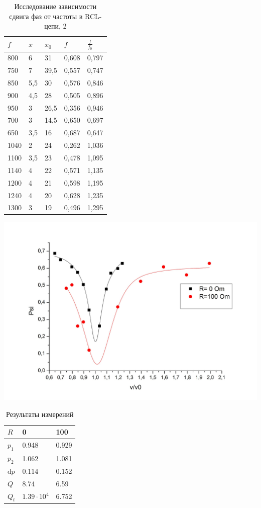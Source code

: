 \documentclass[a4paper,12pt]{article}
\newcommand{\dif}{\mathrm{d}}
\begin{document}
	\begin{table}[h]
		\centering
		\caption{Исследование зависимости сдвига фаз от частоты в RCL-цепи, 2}
		\label{my-label}
		\begin{tabular}{|l|l|l|l|l|}
			\hline
			$f$    & $x$   & $x_0$ & $f$     & $\frac{f}{f_0}$ \\ \hline
			800  & 6   & 31   & 0,608 & 0,797  \\ \hline
			750  & 7   & 39,5 & 0,557 & 0,747  \\ \hline
			850  & 5,5 & 30   & 0,576 & 0,846  \\ \hline
			900  & 4,5 & 28   & 0,505 & 0,896  \\ \hline
			950  & 3   & 26,5 & 0,356 & 0,946  \\ \hline
			700  & 3   & 14,5 & 0,650 & 0,697  \\ \hline
			650  & 3,5 & 16   & 0,687 & 0,647  \\ \hline
			1040 & 2   & 24   & 0,262 & 1,036  \\ \hline
			1100 & 3,5 & 23   & 0,478 & 1,095  \\ \hline
			1140 & 4   & 22   & 0,571 & 1,135  \\ \hline
			1200 & 4   & 21   & 0,598 & 1,195  \\ \hline
			1240 & 4   & 20   & 0,628 & 1,235  \\ \hline
			1300 & 3   & 19   & 0,496 & 1,295  \\ \hline
		\end{tabular}
	\end{table}
	
	\includegraphics[width = 0.7\linewidth]{graph5}

	\begin{table}[h]
		\centering
		\caption{Результаты измерений}
		\label{my-label}
		\begin{tabular}{|l|l|l|}
			\hline
			$R$      & 0                & 100   \\ \hline
			$p_1$    & 0.948            & 0.929 \\ \hline
			$p_2$    & 1.062            & 1.081 \\ \hline
			$\dif p$ & 0.114            & 0.152 \\ \hline
			$Q$      & 8.74             & 6.59  \\ \hline
			$Q_t$    & $1.39\cdot 10^4$ & 6.752 \\ \hline
		\end{tabular}
	\end{table}
	
\end{document}
